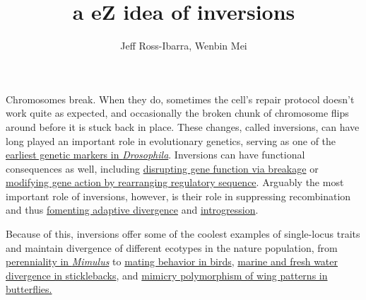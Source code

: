 \documentclass[]{article}
\begin{document}
\title{a eZ idea of inversions}
\author{Jeff Ross-Ibarra, Wenbin Mei}
\maketitle

Chromosomes break. 
When they do, sometimes the cell's repair protocol doesn't work quite as expected, and occasionally the broken chunk of chromosome flips around before it is stuck back in place.  These changes, called inversions, can  have long played an important role in evolutionary genetics, serving as one of the \href{https://books.google.com/books?hl=en&lr=&id=PLSPhg3KPGgC&oi=fnd&pg=PA2&dq=Drosophila+Inversion+Polymorphism&ots=q3cP1SFpd-&sig=QFJcWW1RO6iSYEfqP-fx37R8hZw#v=onepage&q=Drosophila\%20Inversion\%20Polymorphism&f=false}{earliest genetic markers in \textit{Drosophila}}.  
Inversions can have functional consequences as well, including \href{http://www.bloodjournal.org/content/99/1/168?sso-checked=true}{disrupting gene function via breakage} or \href{http://www.plantcell.org/content/5/11/1541.short}{modifying gene action by rearranging regulatory sequence}. 
Arguably the most important role of inversions, however, is their role in suppressing recombination and thus \href{http://onlinelibrary.wiley.com/doi/10.1111/j.1558-5646.2009.00786.x/full}{fomenting adaptive divergence} and \href{http://onlinelibrary.wiley.com/doi/10.1111/mec.13074/abstract}{introgression}.

Because of this, inversions offer some of the coolest examples of single-locus traits and maintain divergence of different ecotypes in the nature population, from \href{http://journals.plos.org/plosbiology/article?id=10.1371/journal.pbio.1000500}{perenniality in \textit{Mimulus}} to \href{http://www.nature.com/ng/journal/v48/n1/full/ng.3443.html}{mating behavior in birds}, \href{http://www.nature.com/nature/journal/v484/n7392/full/nature10944.html#ref41}{marine and fresh water divergence in sticklebacks}, and \href{http://www.nature.com/nature/journal/v477/n7363/full/nature10341.html}{mimicry polymorphism of wing patterns in butterflies.}  
\end{document}
